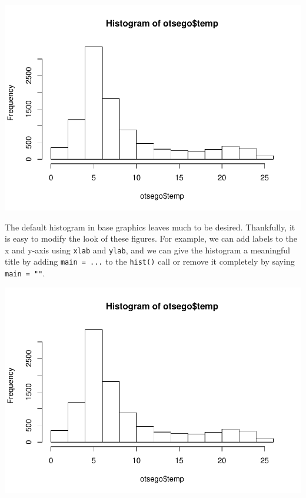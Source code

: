 \documentclass[
]{book}
\newenvironment{Shaded}{\begin{snugshade}}{\end{snugshade}}
\newcommand{\DataTypeTok}[1]{\textcolor[rgb]{0.13,0.29,0.53}{#1}}
\newcommand{\KeywordTok}[1]{\textcolor[rgb]{0.13,0.29,0.53}{\textbf{#1}}}
\newcommand{\NormalTok}[1]{#1}
\newcommand{\OperatorTok}[1]{\textcolor[rgb]{0.81,0.36,0.00}{\textbf{#1}}}
\newcommand{\StringTok}[1]{\textcolor[rgb]{0.31,0.60,0.02}{#1}}
\begin{document}
\includegraphics{worstr_files/figure-latex/unnamed-chunk-85-1.pdf}

The default histogram in base graphics leaves much to be desired. Thankfully, it is easy to modify the look of these figures. For example, we can add labels to the x and y-axis using \texttt{xlab} and \texttt{ylab}, and we can give the histogram a meaningful title by adding \texttt{main\ =\ ...} to the \texttt{hist()} call or remove it completely by saying \texttt{main\ =\ ""}.

\begin{Shaded}
\end{Shaded}

\includegraphics{worstr_files/figure-latex/unnamed-chunk-86-1.pdf}
\end{document}
